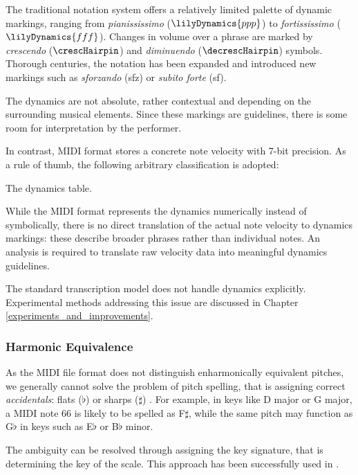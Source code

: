 The traditional notation system offers a relatively limited palette of dynamic markings, ranging from \emph{pianississimo} ($\lilyDynamics{ppp}$) to \emph{fortississimo} ($\lilyDynamics{fff}$). Changes in volume over a phrase are marked by \emph{crescendo} ($\crescHairpin$) and \emph{diminuendo} ($\decrescHairpin$) symbols. Thorough centuries, the notation has been expanded and introduced new markings such as \emph{sforzando} (sfz) or \emph{subito forte} (sf).

The dynamics are not absolute, rather contextual and depending on the surrounding musical elements. Since these markings are guidelines, there is some room for interpretation by the performer.
	 	 
In contrast, MIDI format stores a concrete note velocity with 7-bit precision. As a rule of thumb, the following arbitrary classification is adopted:

\begin{table}[!ht]
\centering

\caption[The dynamics table.]{The dynamics table.\missing}
\end{table}

While the MIDI format represents the dynamics numerically instead of symbolically, there is no direct translation of the actual note velocity to dynamics markings: these describe broader phrases rather than individual notes. An analysis is required to translate raw velocity data into meaningful dynamics guidelines.
	 
The standard transcription model does not handle dynamics explicitly. Experimental methods addressing this issue are discussed in Chapter \ref{experiments_and_improvements}.

\subsubsection{Harmonic Equivalence}\label{harmonic_equivalence}

As the MIDI file format does not distinguish enharmonically  equivalent pitches, we generally cannot solve the problem  of pitch spelling, that is assigning correct \emph{accidentals}: flats ($\flat$) or sharps ($\sharp$) \cite{Cambouropoulos2000}. For example, in keys like D major or G major, a MIDI note 66 is likely to be spelled as F$\sharp$, while the same pitch may function as G$\flat$ in keys such as E$\flat$ or B$\flat$ minor.

The ambiguity can be resolved through assigning the key signature, that is determining the key of the scale. This approach has been successfully used in \cite{Liu2022}.

